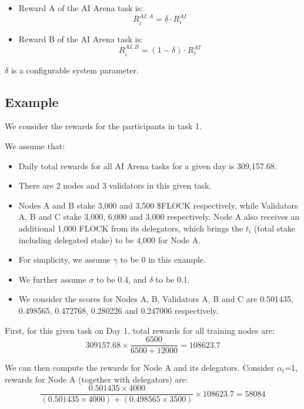 \documentclass[conference]{IEEEtran}
\newcommand{\SNT}{{AI Arena}\xspace}
\begin{document}
\begin{itemize}
            \begin{itemize}
            \item Reward A of the \SNT task is: 
            $$R^{AI, A}_i = \delta \cdot R^{AI}_i$$ 
            

        \item Reward B of the \SNT task is:
        $$R^{AI, B}_i = (1-\delta) \cdot R^{AI}_i$$

        \end{itemize}
        $\delta$ is a configurable system parameter.



\end{itemize}

\subsection{Example} 

We consider the rewards for the participants in task 1.

We assume that:
\begin{itemize}
    \item Daily total rewards for all AI Arena tasks for a given day is 309,157.68.
    \item There are 2 nodes and 3 validators in this given task.
    \item Nodes A and B stake 3,000 and 3,500 \$FLOCK respectively, while Validators A, B and C stake 3,000, 6,000 and 3,000 respectively. Node A also receives an additional 1,000 FLOCK from its delegators, which brings the $t_i$ (total stake including delegated stake) to be 4,000 for Node A.
    \item For simplicity, we assume $\gamma$ to be 0 in this example.
    \item We further assume $\sigma$ to be 0.4, and $\delta$ to be 0.1.
    \item We consider the scores for Nodes A, B, Validators A, B and C are 0.501435, 0.498565, 0.472768, 0.280226 and 0.247006 respectively.
\end{itemize}

First, for this given task on Day 1, total rewards for all training nodes are:
    $$309157.68 \times \frac{6500}{6500 + 12000}=108623.7$$

We can then compute the rewards for Node A and its delegators. Consider $\alpha_t$=1, rewards for Node A (together with delegators) are: 
    $$\frac{0.501435 \times 4000}{(0.501435 \times 4000) + (0.498565 \times 3500)} \times 108623.7 = 58084$$
    
\end{document}
